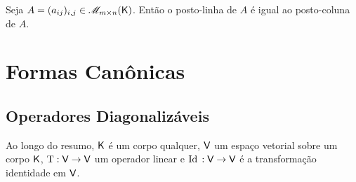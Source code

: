 \documentclass[10pt,a4paper]{book}
\begin{document}
\begin{corollary}
	Seja $A = (a_{ij})_{i,j} \in \mathscr{ M }_{m \times n}(\mathsf{ K })$. Então o posto-linha de $A$ é igual ao posto-coluna de $A$.
\end{corollary}




\chapter{Formas Canônicas}




\section{Operadores Diagonalizáveis}

Ao longo do resumo, $\mathsf{ K }$ é um corpo qualquer, $\mathsf{ V }$ um espaço vetorial sobre um corpo $\mathsf{ K }$, $\mathrm{ T } : \mathsf{ V } \rightarrow \mathsf{ V }$ um operador linear e $\mathrm{ Id }\, : \mathsf{ V } \rightarrow \mathsf{ V }$ é a transformação identidade em $\mathsf{ V }$.
\end{document}
